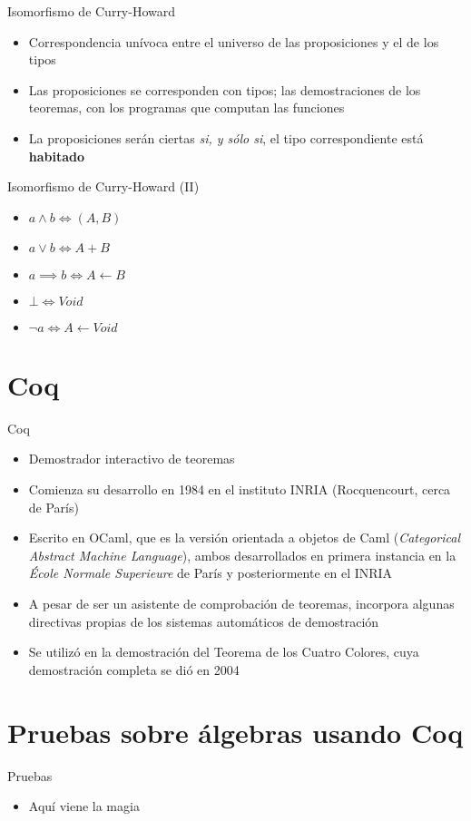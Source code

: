 \documentclass[10pt]{beamer}
\begin{document}
\begin{frame}[fragile]{Isomorfismo de Curry-Howard}

  \begin{itemize}
  \item Correspondencia unívoca entre el universo de las proposiciones y el de los tipos
  \item Las proposiciones se corresponden con tipos; las demostraciones de los teoremas, con los programas que computan las funciones
  \item La proposiciones serán ciertas \textit{si, y sólo si}, el tipo correspondiente está \textbf{habitado}
  \end{itemize}

\end{frame}

\begin{frame}[fragile]{Isomorfismo de Curry-Howard (II)}

  \begin{itemize}
  \item $a \land b \iff (A, B)$
  \item $a \lor b \iff A + B$
  \item $a \implies b \iff A \leftarrow B$
  \item $\bot \iff Void$
  \item $\neg a \iff A \leftarrow Void$
  \end{itemize}

\end{frame}

\section{Coq}

\begin{frame}[fragile]{Coq}

  \begin{itemize}
  \item Demostrador interactivo de teoremas
  \item Comienza su desarrollo en 1984 en el instituto INRIA
    (Rocquencourt, cerca de París)
  \item Escrito en OCaml, que es la versión orientada a objetos de
    Caml (\textit{Categorical Abstract Machine Language}), ambos
    desarrollados en primera instancia en la \textit{École Normale
      Superieure} de París y posteriormente en el INRIA
  \item A pesar de ser un asistente de comprobación de teoremas,
    incorpora algunas directivas propias de los sistemas automáticos
    de demostración
  \item Se utilizó en la demostración del Teorema de los Cuatro Colores,
    cuya demostración completa se dió en 2004
  \end{itemize}

\end{frame}

\section{Pruebas sobre álgebras usando Coq}

\begin{frame}[fragile]{Pruebas}

  \begin{itemize}
  \item Aquí viene la magia
  \end{itemize}

\end{frame}
\end{document}
